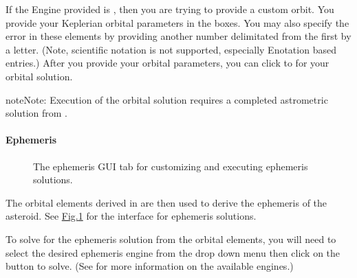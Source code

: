 \documentclass[letterpaper,11pt,english]{sphinxmanual}
\begin{document}
\sphinxAtStartPar
If the Engine provided is , then you are trying to provide a
custom orbit. You provide your Keplerian orbital parameters in the boxes. You
may also specify the error in these elements by providing another number
delimitated from the first by a letter. (Note, scientific notation is not
supported, especially E\sphinxhyphen{}notation based entries.) After you provide your
orbital parameters, you can click  to  for your
orbital solution.

\begin{sphinxadmonition}{note}{Note:}
\sphinxAtStartPar
Execution of the orbital solution requires a completed astrometric
solution from
{\hyperref[\detokenize{user/manual_mode:user-manual-mode-procedure-find-asteroid-location-compute-astrometric-solution}]{}}.
\end{sphinxadmonition}


\paragraph{Ephemeris}
\label{\detokenize{user/manual_mode:ephemeris}}\label{\detokenize{user/manual_mode:user-manual-mode-procedure-ephemeris}}
\begin{figure}[htbp]
\centering
\capstart

\noindent{}
\caption{The ephemeris GUI tab for customizing and executing ephemeris solutions.}\label{\detokenize{user/manual_mode:id9}}\label{\detokenize{user/manual_mode:figure-manual-mode-gui-ephemeris}}\end{figure}

\sphinxAtStartPar
The orbital elements derived in {\hyperref[\detokenize{user/manual_mode:user-manual-mode-procedure-orbital-elements}]{}}
are then used to derive the ephemeris of the asteroid. See
\hyperref[\detokenize{user/manual_mode:figure-manual-mode-gui-ephemeris}]{Fig.\@ \ref{\detokenize{user/manual_mode:figure-manual-mode-gui-ephemeris}}} for the interface for ephemeris
solutions.

\sphinxAtStartPar
To solve for the ephemeris solution from the orbital elements, you will need to
select the desired ephemeris engine from the drop down menu then click on the
 button to solve.
(See {\hyperref[\detokenize{technical/architecture/services_engines:technical-architecture-services-engines}]{}} for more information on
the available engines.)
\end{document}
